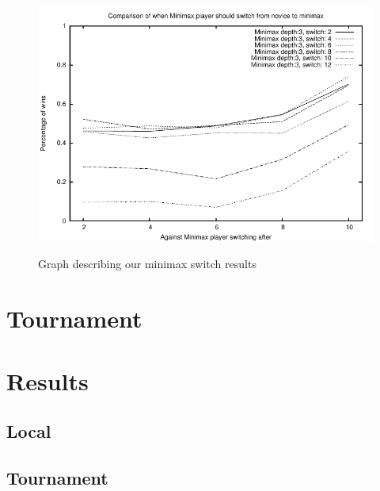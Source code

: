 \documentclass[titlepage, a4paper]{article}
\begin{document}
\begin{figure}[htb]
	\includegraphics{graphs/switch.pdf}
	\label{fig:minimax switch}
	\caption{Graph describing our minimax switch results}
\end{figure}

\section{Tournament}\label{tournament}

\section{Results}\label{results}

\subsection{Local}\label{results:local}

\subsection{Tournament}\label{results:tournament}

\end{document}
